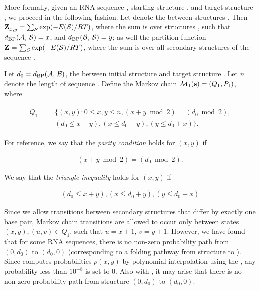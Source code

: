 \documentclass[11pt, oneside]{Thesis} %
\providecommand{\DIFadd}[1]{{\protect\color{blue}\uwave{#1}}} %
\providecommand{\DIFdel}[1]{{\protect\color{red}\sout{#1}}}                      %
\providecommand{\DIFaddbegin}{} %
\providecommand{\DIFaddend}{} %
\providecommand{\DIFdelbegin}{} %
\providecommand{\DIFdelend}{} %
\begin{document}
More formally, given an RNA sequence \seq, starting structure \strA, and
target structure \strB, we proceed in the following fashion. Let \dBP{\strA}{\strB} denote the \bpd between structures
\strAB. Then ${\bf Z}^{}_{x,y} = \sum_\mathcal S \exp(-E(\mathcal S)/RT)$, where the sum is over
structures \str, such that $d_{\text{BP}}(\mathcal A,\,\mathcal S) = x$, and
$d_{\text{BP}}(\mathcal B,\,\mathcal S) = y$; as
well the partition function ${\bf Z}^{}_{} = \sum_\mathcal S \exp(-E(\mathcal S)/RT)$, where the sum
is over all secondary structures \str of the sequence \seq.

Let $d_0= d_{\text{BP}}(\mathcal A,\,\mathcal B)$, the \bpd between initial structure
\strA and target structure \strB.  Let $n$ denote the length of sequence \seq.
Define the Markov chain $\mathcal{M}_1({\bf s}) = (Q_1,P_1)$, where

\begin{align}
\label{eq:hermes:markovChainDef}
\begin{split}
Q_1 =\;& \{ (x,y) : 0 \leq x,y \leq n, (x+y \bmod 2)
= (d_0 \bmod 2), \\
& (d_0 \leq x+y), (x \leq d_0 + y), (y \leq d_0 + x) \}.
\end{split}
\end{align}

For reference, we say that the {\em parity condition} holds for
$(x,y)$ if

\begin{align}
\label{eq:hermes:parityCondition} (x+y \bmod 2) = (d_0 \bmod 2).
\end{align}

We say that the {\em triangle inequality} holds for $(x,y)$ if

\begin{align}
\label{eq:hermes:triangleInequality} (d_0 \leq x+y), (x \leq d_0 + y), (y
\leq d_0 + x)
\end{align}

Since we allow transitions between secondary structures that differ by
exactly one base pair, Markov chain transitions are allowed to occur
only between states $(x,y),(u,v) \in Q_1$, such that $u=x\pm 1$, $v =
y \pm 1$. However, we have found that for some RNA sequences, there is
no non-zero probability path from $(0,d_0)$ to $(d_0,0)$
(corresponding to a folding pathway from structure \strA to
\strB). Since \ffttwo computes \DIFdelbegin %
\DIFdel{probabilities }%
\DIFdelend \DIFaddbegin \DIFadd{probabilities }\DIFaddend $p(x,y)$ by
polynomial interpolation using the \fft, any
probability less than $10^{-8}$ is set to \DIFdelbegin \DIFdel{0. }\DIFdelend \DIFaddbegin \DIFadd{$0$. }\DIFaddend Also with \rnatwofold,
it may arise that there is no non-zero probability path
from structure $(0,d_0)$ to $(d_0,0)$.
\end{document}
